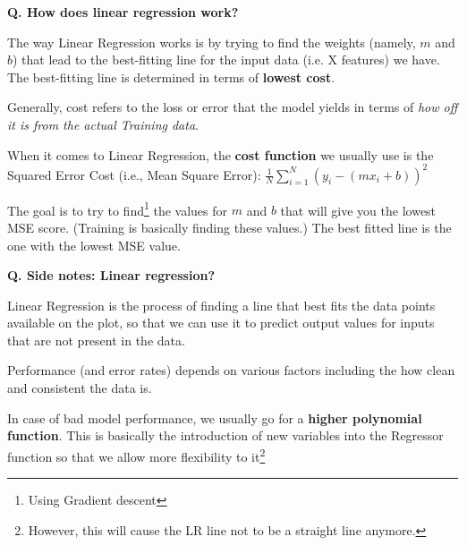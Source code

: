 \begin{frame}[fragile]{\textbf{Q. How does linear regression work?}}
  \begin{wideitemize}
  \item The way Linear Regression works is by trying to find the weights (namely, $m$ and $b$)
  that lead to the best-fitting line for the input data (i.e. X features) we have.
  The best-fitting line is determined in terms of \textbf{lowest cost}.\medskip
  \begin{wideitemize}
    \item Generally, cost refers to the loss or error that the model yields in terms
    of \textit{how off it is from the actual Training data}.
    \item When it comes to Linear Regression, the \textbf{cost function} we usually
    use is the Squared Error Cost (i.e., Mean Square Error):
    $\frac{1}{N} \sum_{i=1}^N (y_{i}-(mx_{i} + b))^2$
    \item The goal is to try to find\footnote{Using Gradient descent} the values for
    $m$ and $b$ that will give you the lowest MSE score. (Training is basically finding
    these values.) The best fitted line is the one with the lowest MSE value.
  \end{wideitemize}
  \end{wideitemize}
\end{frame}


\begin{frame}[fragile]{\textbf{Q. Side notes: Linear regression?}}
  \begin{wideitemize}
    \item Linear Regression is the process of finding a line that best fits the data
    points available on the plot, so that we can use it to predict output values for
    inputs that are not present in the data.
    \item Performance (and error rates) depends on various factors including the
    how clean and consistent the data is.
    \item In case of bad model performance, we usually go for a \textbf{higher polynomial function}.
    This is basically the introduction of new variables into the Regressor function so
    that we allow more flexibility to it\footnote{However, this will cause the LR line
    not to be a straight line anymore.}
  \end{wideitemize}
\end{frame}

